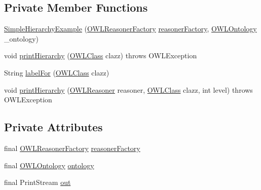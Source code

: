 \subsection*{Private Member Functions}
\begin{DoxyCompactItemize}
\item 
\hyperlink{classuk_1_1ac_1_1manchester_1_1owl_1_1owlapi_1_1tutorial_1_1examples_1_1_simple_hierarchy_example_af601a1714fff0fa96cf3abbdfde0827f}{Simple\-Hierarchy\-Example} (\hyperlink{interfaceorg_1_1semanticweb_1_1owlapi_1_1reasoner_1_1_o_w_l_reasoner_factory}{O\-W\-L\-Reasoner\-Factory} \hyperlink{classuk_1_1ac_1_1manchester_1_1owl_1_1owlapi_1_1tutorial_1_1examples_1_1_simple_hierarchy_example_ac958677fb0579973031fc48bd678113e}{reasoner\-Factory}, \hyperlink{interfaceorg_1_1semanticweb_1_1owlapi_1_1model_1_1_o_w_l_ontology}{O\-W\-L\-Ontology} \-\_\-ontology)
\item 
void \hyperlink{classuk_1_1ac_1_1manchester_1_1owl_1_1owlapi_1_1tutorial_1_1examples_1_1_simple_hierarchy_example_aa43c03e82b5e0f85b45b2ad48a5e614a}{print\-Hierarchy} (\hyperlink{interfaceorg_1_1semanticweb_1_1owlapi_1_1model_1_1_o_w_l_class}{O\-W\-L\-Class} clazz)  throws O\-W\-L\-Exception 
\item 
String \hyperlink{classuk_1_1ac_1_1manchester_1_1owl_1_1owlapi_1_1tutorial_1_1examples_1_1_simple_hierarchy_example_ac2e016f5e1a71852af6d38f4f308b9f2}{label\-For} (\hyperlink{interfaceorg_1_1semanticweb_1_1owlapi_1_1model_1_1_o_w_l_class}{O\-W\-L\-Class} clazz)
\item 
void \hyperlink{classuk_1_1ac_1_1manchester_1_1owl_1_1owlapi_1_1tutorial_1_1examples_1_1_simple_hierarchy_example_a56608a7fa8ba08e27f4764568c29f3b0}{print\-Hierarchy} (\hyperlink{interfaceorg_1_1semanticweb_1_1owlapi_1_1reasoner_1_1_o_w_l_reasoner}{O\-W\-L\-Reasoner} reasoner, \hyperlink{interfaceorg_1_1semanticweb_1_1owlapi_1_1model_1_1_o_w_l_class}{O\-W\-L\-Class} clazz, int level)  throws O\-W\-L\-Exception 
\end{DoxyCompactItemize}
\subsection*{Private Attributes}
\begin{DoxyCompactItemize}
\item 
final \hyperlink{interfaceorg_1_1semanticweb_1_1owlapi_1_1reasoner_1_1_o_w_l_reasoner_factory}{O\-W\-L\-Reasoner\-Factory} \hyperlink{classuk_1_1ac_1_1manchester_1_1owl_1_1owlapi_1_1tutorial_1_1examples_1_1_simple_hierarchy_example_ac958677fb0579973031fc48bd678113e}{reasoner\-Factory}
\item 
final \hyperlink{interfaceorg_1_1semanticweb_1_1owlapi_1_1model_1_1_o_w_l_ontology}{O\-W\-L\-Ontology} \hyperlink{classuk_1_1ac_1_1manchester_1_1owl_1_1owlapi_1_1tutorial_1_1examples_1_1_simple_hierarchy_example_ae539eb0936ab4e3e810a68392134ba2a}{ontology}
\item 
final Print\-Stream \hyperlink{classuk_1_1ac_1_1manchester_1_1owl_1_1owlapi_1_1tutorial_1_1examples_1_1_simple_hierarchy_example_aa7858478b89096cac705eee9f16adb51}{out}
\end{DoxyCompactItemize}
